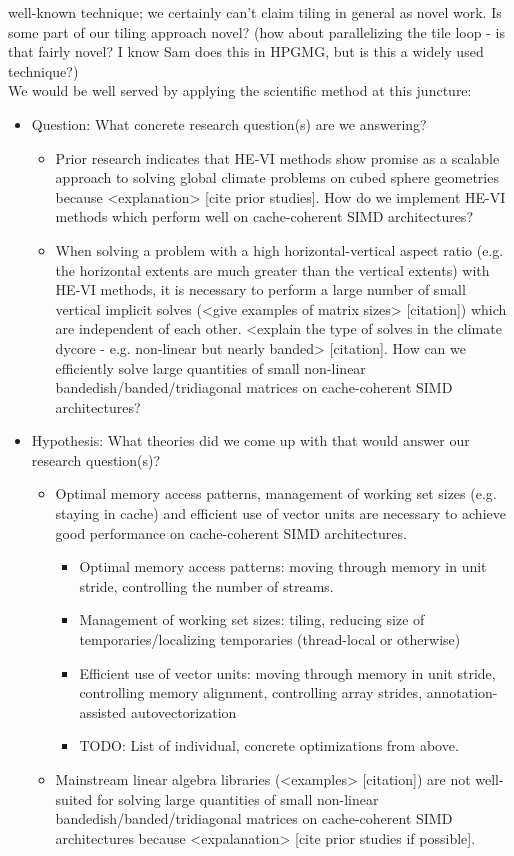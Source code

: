 \documentclass[conference]{IEEEtran}
\begin{document}
well-known technique; we certainly can't claim tiling in general as
novel work. Is some part of our tiling approach novel? (how about
parallelizing the tile loop - is that fairly novel? I know Sam does
this in HPGMG, but is this a widely used technique?)
\\
We would be well served by applying the scientific method at this juncture:
\\
\begin{itemize}
\item Question: What concrete research question(s) are we answering?
\begin{itemize}
\item Prior research indicates that HE-VI methods show promise as a
scalable approach to solving global climate problems on cubed sphere
geometries because <explanation> [cite prior studies]. How do we
implement HE-VI methods which perform well on cache-coherent SIMD
architectures?
\item When solving a problem with a high horizontal-vertical aspect ratio
(e.g. the horizontal extents are much greater than the vertical
extents) with HE-VI methods, it is necessary to perform a large number
of small vertical implicit solves (<give examples of matrix sizes>
[citation]) which are independent of each other. <explain the type of
solves in the climate dycore - e.g. non-linear but nearly banded>
[citation]. How can we efficiently solve large quantities of small
non-linear bandedish/banded/tridiagonal matrices on cache-coherent
SIMD architectures?
\end{itemize}
\item Hypothesis: What theories did we come up with that would answer our
research question(s)?
\begin{itemize}
\item Optimal memory access patterns, management of working set sizes
(e.g. staying in cache) and efficient use of vector units are
necessary to achieve good performance on cache-coherent SIMD
architectures.
\begin{itemize}
\item Optimal memory access patterns: moving through memory in unit
stride, controlling the number of streams.
\item Management of working set sizes: tiling, reducing size of
temporaries/localizing temporaries (thread-local or otherwise)
\item Efficient use of vector units: moving through memory in unit
stride, controlling memory alignment, controlling array strides,
annotation-assisted autovectorization
\item TODO: List of individual, concrete optimizations from above.
\end{itemize}
\item Mainstream linear algebra libraries (<examples> [citation]) are not
well-suited for solving large quantities of small non-linear
bandedish/banded/tridiagonal matrices on cache-coherent SIMD
architectures because <expalanation> [cite prior studies if possible].
\end{itemize}



\end{itemize}
\end{document}
